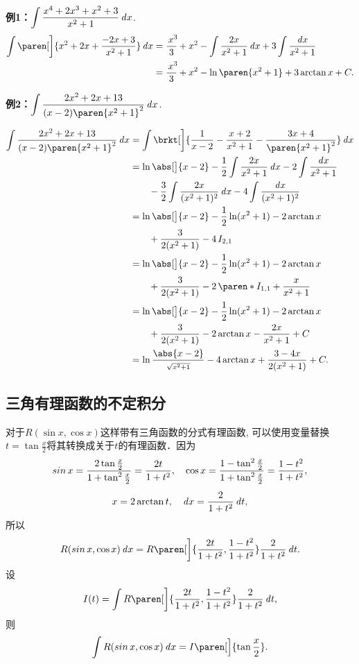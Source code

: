 \documentclass[a4paper,punct=CCT]{ctexbook}
\newcommand*{\ex}[2]{\textbf{例#1：}#2}
\newcommand*{\disp}[1]{\( \displaystyle #1 \)}
\newcommand*{\exds}[2]{\ex{#1}\disp{#2}}
\theoremstyle{definition}
\theoremstyle{remark}
\begin{document}
\exds{1}{\int \frac{x^4 + 2x^3 + x^2 + 3}{x^2 + 1} \dx}.
\begin{align*}
  \int \paren[\bigg]{x^2 + 2x + \frac{-2x+3}{x^2 + 1}} \dx
  &= \frac{\,x^3\!}{3} + x^2 - \int \frac{2x}{x^2 + 1} \dx + 3 \int \frac{\dx}{x^2 + 1} \\
  &= \frac{\,x^3\!}{3} + x^2 - \ln\paren{x^2+1} + 3 \arctan x + C.
\end{align*}

\exds{2}{\int \frac{2x^2 + 2x + 13}{(x-2)\paren{x^2+1}^2} \dx}.

\begin{align*}
  \int \frac{2x^2 + 2x + 13}{(x-2)\paren{x^2+1}^2} \dx
  &= \int \brkt[\bigg]{\frac{1}{x-2} - \frac{x+2}{x^2+1} - \frac{3x+4}{\paren{x^2+1}^2}} \dx \\
  &= \ln\abs[\big]{x-2}
    - \frac12 \int \frac{2x}{x^2+1} \dx
    - 2 \int \frac{\dx}{x^2+1} \\
  &\qquad - \frac32 \int \frac{2x}{(x^2+1)^2} \dx - 4 \int \frac{\dx}{(x^2+1)^2} \\
  &= \ln\abs[\big]{x-2} - \frac12 \ln(x^2+1) - 2 \arctan x \\
  &\qquad + \frac{3}{2(x^2+1)} - 4 \, I_{2,1} \\
  &= \ln\abs[\big]{x-2} - \frac12 \ln(x^2+1) - 2 \arctan x \\
  &\qquad + \frac{3}{2(x^2+1)} - 2 \, \paren*{I_{1,1} + \frac{x}{x^2+1}} \\
  &= \ln\abs[\big]{x-2} - \frac12 \ln(x^2+1) - 2 \arctan x \\
  &\qquad + \frac{3}{2(x^2+1)} - 2 \arctan x  - \frac{2x}{x^2+1} + C \\
  &= \ln\frac{\abs{x-2}}{\scriptstyle\sqrt{x^2+1}} - 4 \arctan x + \frac{3-4x}{2(x^2+1)} + C.
\end{align*}

\subsection{三角有理函数的不定积分}

对于\(R(\sin x, \cos x)\)这样带有三角函数的分式有理函数, 可以使用变量替换\(t = \tan\frac{x}{2}\)将其转换成关于\(t\)的有理函数．因为
\begin{gather*}
  \operatorname{\smash{sin}} x = \frac{2\tan\frac{x}{2}}{1+\tan^2\frac{x}{2}} = \frac{2t}{1+t^2},
  \quad
  \cos x = \frac{1 - \tan^2\frac{x}{2}}{1+\tan^2\frac{x}{2}} = \frac{1-t^2}{1+t^2}, \\[1ex]
  x = 2 \arctan t,
  \quad
  \mathop{}\!\mathit{d} x = \frac{2}{1+t^2} \mathop{}\!\mathit{d} t,
\end{gather*}
所以
\[
  R(\sin x, \cos x) \dx = R\paren[\bigg]{\frac{2t}{1+t^2}, \frac{1-t^2}{1+t^2}} \frac{2}{1+t^2} \dt.
\]
设
\[
  I(t) = \int R\paren[\bigg]{\frac{2t}{1+t^2}, \frac{1-t^2}{1+t^2}} \frac{2}{1+t^2} \dt,
\]
则
\[
  \int R(\sin x, \cos x) \dx = I\paren[\Big]{\tan\frac{x}{2}}.
\]
\end{document}
